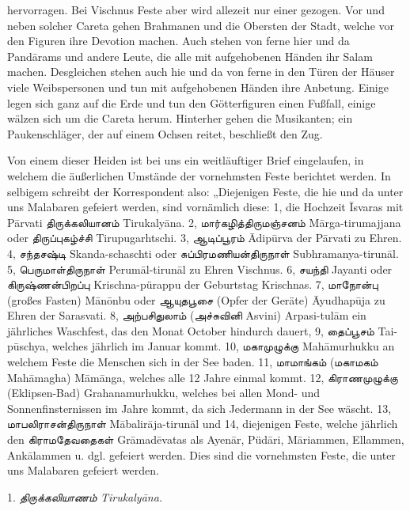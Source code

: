 \documentclass{article}
\newcommand{\TamilText}[1]{\texttamil{#1}}
\newcommand{\tam}[1]{\TamilText{#1}}
\begin{document}
hervorragen. Bei Vischnus Feste aber wird allezeit nur einer gezogen. Vor und neben solcher Careta gehen Brahmanen und die Obersten der Stadt, welche vor den Figuren ihre Devotion machen. Auch stehen von ferne hier und da Pand\={a}rams und andere Leute, die alle mit aufgehobenen Händen ihr Salam machen. Desgleichen stehen auch hie und da von ferne in den Türen der Häuser viele Weibspersonen und tun mit aufgehobenen Händen ihre Anbetung. Einige legen sich ganz auf die Erde und tun den Götterfiguren einen Fußfall, einige wälzen sich um die Careta herum. Hinterher gehen die Musikanten; ein Paukenschläger, der auf einem Ochsen reitet, beschließt den Zug.

Von einem dieser Heiden ist bei uns ein weitläuftiger Brief eingelaufen, in welchem die äußerlichen Umstände der vornehmsten Feste berichtet werden. In selbigem schreibt der Korrespondent also: „Diejenigen Feste, die hie und da unter uns Malabaren gefeiert werden, sind vornämlich diese: 1, die Hochzeit \={I}svaras mit P\={a}rvati \tam{திருக்கலியானம்} Tirukaly\={a}na. 2, \tam{மார்கழித்திருமஞ்சனம்} M\={a}rga-tirumajjana oder \tam{திருப்புகழ்ச்சி} Tirupugarhtschi. 3, \tam{ஆடிப்பூரம்} \={A}dip\={u}rva der P\={a}rvati zu Ehren. 4, \tam{சந்தசஷ்டி} Skanda-schaschti oder \tam{சுப்பிரமணியன்திருநாள்} Subhramanya-tirun\={a}l. 5, \tam{பெருமாள்திருநாள்} Perum\={a}l-tirun\={a}l zu Ehren Vischnus. 6, \tam{சயந்தி} Jayanti oder \tam{கிருஷ்ணன்பிறப்பு} Krischna-pürappu der Geburtstag Krischnas. 7, \tam{மாநோன்பு} (großes Fasten) M\={a}n\={o}nbu oder \tam{ஆயுதபூசை} (Opfer der Geräte) \={A}yudhap\={u}ja zu Ehren der Sarasvati. 8, \tam{அற்பசிதுலாம்} (\tam{அச்சுவினி} Asvini) Arpasi-tul\={a}m ein jährliches Waschfest, das den Monat October hindurch dauert, 9, \tam{தைப்பூசம்} Tai-p\={u}schya, welches jährlich im Januar kommt. 10, \tam{மகாமுழுக்கு} Mah\={a}murhukku an welchem Feste die Menschen sich in der See baden. 11, \tam{மாமாங்கம்} (\tam{மகாமகம்} Mah\={a}magha) M\={a}m\={a}nga, welches alle 12 Jahre einmal kommt. 12, \tam{கிராணமுழுக்கு} (Eklipsen-Bad) Grahanamurhukku, welches bei allen Mond- und Sonnenfinsternissen im Jahre kommt, da sich Jedermann in der See wäscht. 13, \tam{மாபலிராசன்திருநாள்} M\={a}balir\={a}ja-tirun\={a}l und 14, diejenigen Feste, welche jährlich den \tam{கிராமதேவதைகள்} Gr\={a}mad\={e}vatas als Ayen\={a}r, Püd\={a}ri, M\={a}riammen, Ellammen, Ank\={a}lammen u. dgl. gefeiert werden. Dies sind die vornehmsten Feste, die unter uns Malabaren gefeiert werden.

\begin{center}
1. \emph{\tam{திருக்கலியாணம்} Tirukaly\={a}na.}
\end{center}
\end{document}
